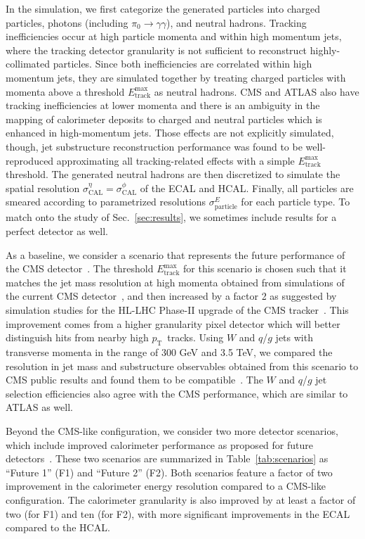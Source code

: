 \documentclass[11pt,letterpaper]{article}
\DeclareRobustCommand{\Sec}[1]{Sec.~\ref{#1}}
\newcommand{\pt}{p_{\mathrm{T}}}
\begin{document}
In the simulation, we first categorize the generated particles into charged particles, photons (including $\pi_0\to\gamma\gamma$), and neutral hadrons.
%
Tracking inefficiencies occur at high particle momenta and within high momentum jets, where the tracking detector granularity is not sufficient to reconstruct highly-collimated particles.
%
Since both inefficiencies are correlated within high momentum jets, they are simulated together by treating charged particles with momenta above a threshold $E_{\text{track}}^{\text{max}}$ as neutral hadrons.
%
CMS and ATLAS also have tracking inefficiencies at lower momenta and there is an ambiguity in the mapping of calorimeter deposits to charged and neutral particles which is enhanced in high-momentum jets.
%
Those effects are not explicitly simulated, though, jet substructure reconstruction performance was found to be well-reproduced approximating all tracking-related effects with a simple $E_{\text{track}}^{\text{max}}$ threshold.
%
The generated neutral hadrons are then discretized to simulate the spatial resolution $\sigma_{\text{CAL}}^{\eta}=\sigma_{\text{CAL}}^{\phi}$ of the ECAL and HCAL.
%
Finally, all particles are smeared according to parametrized resolutions $\sigma_{\text{particle}}^{E}$ for each particle type.
%
To match onto the study of \Sec{sec:results}, we sometimes include results for a perfect detector as well.

As a baseline, we consider a scenario that represents the future performance of the CMS detector~\cite{CMS}.
%
The threshold $E_{\text{track}}^{\text{max}}$ for this scenario is chosen such that it matches the jet mass resolution at high momenta obtained from simulations of the current CMS detector~\cite{CMS-PAS-JME-14-002}, and then increased by a factor 2 as suggested by simulation studies for the HL-LHC Phase-II upgrade of the CMS tracker~\cite{CMS-TDR-17-001}.
%
This improvement comes from a higher granularity pixel detector which will better distinguish hits from nearby high $\pt$~tracks.
%
Using $W$ and $q$/$g$ jets with transverse momenta in the range of 300 GeV and 3.5 TeV, we compared the resolution in jet mass and substructure observables obtained from this scenario to CMS public results and found them to be compatible~\cite{CMS-PAS-JME-16-003, Khachatryan:2014vla, Sirunyan:2016cao}.
%
The $W$ and  $q$/$g$ jet selection efficiencies also agree with the CMS performance, which are similar to ATLAS as well.

Beyond the CMS-like configuration, we consider two more detector scenarios, which include improved calorimeter performance as proposed for future detectors~\cite{Chekanov:2016ppq}.
%
These two scenarios are summarized in Table~\ref{tab:scenarios} as ``Future 1'' (F1) and ``Future 2'' (F2).
%
Both scenarios feature a factor of two improvement in the calorimeter energy resolution compared to a CMS-like configuration.
%
The calorimeter granularity is also improved by at least a factor of two (for F1) and ten (for F2), with more significant improvements in the ECAL compared to the HCAL.
\end{document}
